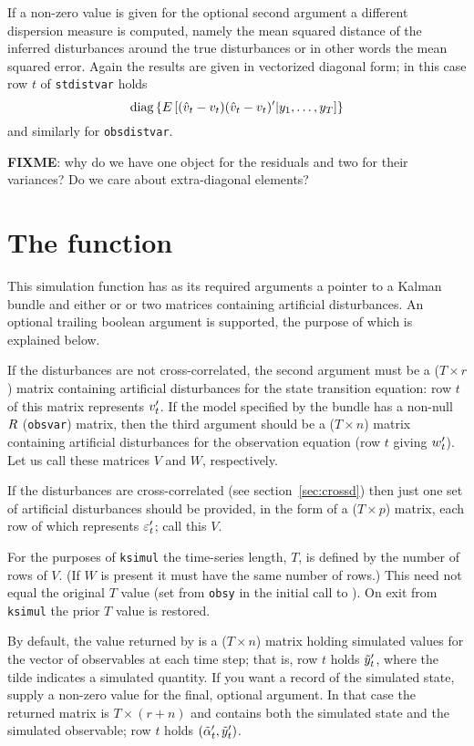 \documentclass[a4paper]{article}
\begin{document}
If a non-zero value is given for the optional second argument a
different dispersion measure is computed, namely the mean squared
distance of the inferred disturbances around the true disturbances or
in other words the mean squared error. Again the results are given in
vectorized diagonal form; in this case row $t$ of \texttt{stdistvar}
holds
\[
\mbox{diag}\left\{E\left[
 (\hat{v}_t-v_t)(\hat{v}_t-v_t)'
 | y_1, \ldots, y_T \right]\right\}
\]
and similarly for \texttt{obsdistvar}.

\textbf{FIXME}: why do we have one object for the residuals and  two
for their variances? Do we care about extra-diagonal elements?

\section{The  function}
\label{sec:ksimul}

This simulation function has as its required arguments a pointer to a
Kalman bundle and either or or two matrices containing artificial
disturbances. An optional trailing boolean argument is supported, the
purpose of which is explained below.

If the disturbances are not cross-correlated, the second argument must
be a ($T \times r$) matrix containing artificial disturbances for the
state transition equation: row $t$ of this matrix represents
$v_t'$. If the model specified by the bundle has a non-null
$R$ (\texttt{obsvar}) matrix, then the third argument should be
a ($T \times n$) matrix containing artificial disturbances for the
observation equation (row $t$ giving $w_t'$). Let us call these
matrices $V$ and $W$, respectively.

If the disturbances are cross-correlated (see
section~\ref{sec:crossd}) then just one set of artificial disturbances
should be provided, in the form of a ($T \times p$) matrix, each row
of which represents $\varepsilon_t'$; call this $V$.

For the purposes of \texttt{ksimul} the time-series length, $T$, is
defined by the number of rows of $V$. (If $W$ is present it must have
the same number of rows.) This need not equal the original $T$ value
(set from \texttt{obsy} in the initial call to ). On
exit from \texttt{ksimul} the prior $T$ value is restored.

By default, the value returned by  is a ($T \times n$)
matrix holding simulated values for the vector of observables at each
time step; that is, row $t$ holds $\tilde{y}_t'$, where the tilde
indicates a simulated quantity.  If you want a record of the simulated
state, supply a non-zero value for the final, optional argument. In
that case the returned matrix is $T \times (r+n)$ and contains both
the simulated state and the simulated observable; row $t$ holds
$(\tilde{\alpha}_t', \tilde{y}_t')$.
\end{document}
